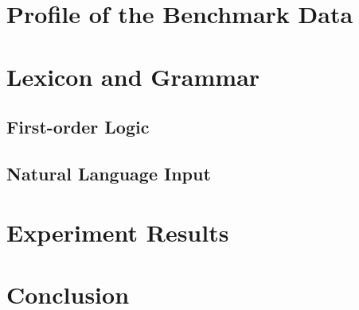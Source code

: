 \documentclass{article}
\begin{document}

\section{Profile of the Benchmark Data}{}

\section{Lexicon and Grammar}{
	\subsection{First-order Logic}{}

	\subsection{Natural Language Input}{}
}

\section{Experiment Results}{}

\section{Conclusion}{}



\citation
\end{document}
